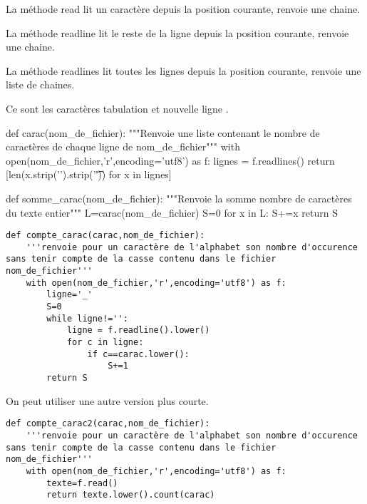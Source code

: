 \question{} 

La méthode read lit un caractère depuis la position courante, renvoie une chaine.

La méthode readline lit le reste de la ligne depuis la position courante, renvoie une chaine.

La méthode readlines lit toutes les lignes depuis la position courante, renvoie une liste de chaines.

\question{} 


Ce sont les caractères \og tabulation\fg{} et \og nouvelle ligne\fg{} .


\question{}

\begin{pyverbatim}
def carac(nom_de_fichier):
    """Renvoie une liste contenant le nombre de caractères
       de chaque ligne de nom_de_fichier"""
    with open(nom_de_fichier,'r',encoding='utf8') as f:
        lignes = f.readlines()
    return [len(x.strip('\n').strip('\t')) for x in lignes]
\end{pyverbatim}


\question{}

\begin{pyverbatim}
def somme_carac(nom_de_fichier):
    """Renvoie la somme nombre de caractères
       du texte entier"""
    L=carac(nom_de_fichier)
    S=0
    for x in L:
        S+=x
    return S
\end{pyverbatim}

\question{}
\begin{lstlisting}
def compte_carac(carac,nom_de_fichier):
    '''renvoie pour un caractère de l'alphabet son nombre d'occurence sans tenir compte de la casse contenu dans le fichier nom_de_fichier'''
    with open(nom_de_fichier,'r',encoding='utf8') as f:
        ligne='_'
        S=0
        while ligne!='':
            ligne = f.readline().lower()
            for c in ligne:
                if c==carac.lower():
                    S+=1
        return S
\end{lstlisting}

On peut utiliser une autre version plus courte.

\begin{lstlisting}
def compte_carac2(carac,nom_de_fichier):
    '''renvoie pour un caractère de l'alphabet son nombre d'occurence sans tenir compte de la casse contenu dans le fichier nom_de_fichier'''
    with open(nom_de_fichier,'r',encoding='utf8') as f:
        texte=f.read()
        return texte.lower().count(carac)
\end{lstlisting}


